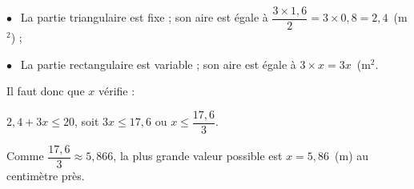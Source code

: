 
\medskip

$\bullet~~$ La partie triangulaire est fixe ; son aire est égale à $\dfrac{3 \times 1,6}{2} = 3 \times 0,8 = 2,4$~(m$^2$) ;

$\bullet~~$ La partie rectangulaire est variable  ; son aire est égale à $3 \times x = 3x$~(m$^2$.

Il faut donc que $x$ vérifie :

$2,4 + 3x \leqslant 20$, soit $3x \leqslant 17,6$ ou $x \leqslant \dfrac{17,6}{3}$.

Comme $\dfrac{17,6}{3} \approx 5,866$, la plus grande valeur possible est $x = 5,86$~(m) au centimètre près.

\bigskip


